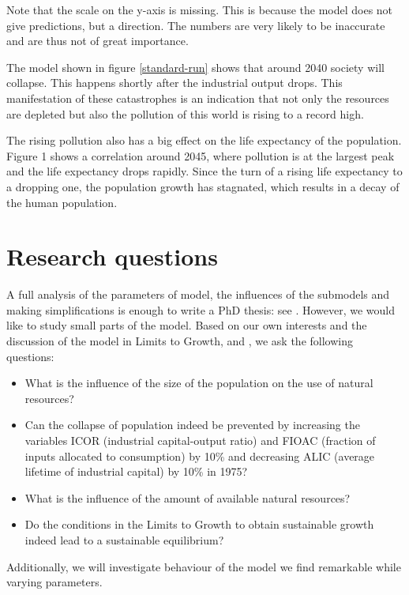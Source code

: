 \documentclass[10pt,a4paper]{scrartcl}
\begin{document}
Note that the scale on the y-axis is missing. This is because the model does not give predictions, but a direction. The numbers are very likely to be inaccurate and are thus not of great importance.

The model shown in figure \ref{standard-run} shows that around 2040 society will collapse. This happens shortly after the industrial output drops. This manifestation of these catastrophes is an indication that not only the resources are depleted but also the pollution of this world is rising to a record high.

The rising pollution also has a big effect on the life expectancy of the population. Figure 1 shows a correlation around 2045, where pollution is at the largest peak and the life expectancy drops rapidly. Since the turn of a rising life expectancy to a dropping one, the population growth has stagnated, which results in a decay of the human population.

\section*{Research questions}

A full analysis of the parameters of model, the influences of the submodels and making simplifications is enough to write a PhD thesis: see \cite{thissen1978investigations}. However, we would like to study small parts of the model. Based on our own interests and the discussion of the model in Limits to Growth, \cite{thissen1978investigations} and \cite{vermeulen1976parameter}, we ask the following questions:

\begin{itemize}
	\item What is the influence of the size of the population on the use of natural resources?
	\item Can the collapse of population indeed be prevented by increasing the variables ICOR (industrial capital-output ratio) and FIOAC (fraction of inputs allocated to consumption) by 10\% and decreasing ALIC (average lifetime of industrial capital) by 10\% in 1975?
	\item What is the influence of the amount of available natural resources?
	\item Do the conditions in the Limits to Growth to obtain sustainable growth indeed lead to a sustainable equilibrium?
\end{itemize}

Additionally, we will investigate behaviour of the model we find remarkable while varying parameters.
\end{document}
